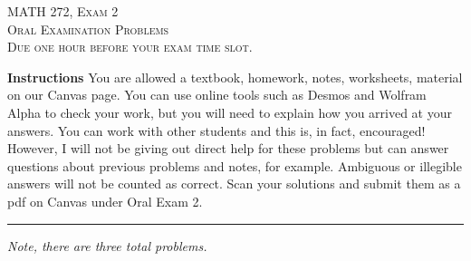 \documentclass[12pt]{amsbook}
\begin{document}

\begin{center}
   \textsc{\large MATH 272, Exam 2}\\
   \textsc{Oral Examination Problems}\\
   \textsc{Due one hour before your exam time slot.}
\end{center}

\vspace{1cm}

\noindent\textbf{Instructions} \; You are allowed a textbook, homework, notes, worksheets, material on our Canvas page.  You can use online tools such as Desmos and Wolfram Alpha to check your work, but you will need to explain how you arrived at your answers.  You can work with other students and this is, in fact, encouraged! However, I will not be giving out direct help for these problems but can answer questions about previous problems and notes, for example. Ambiguous or illegible answers will not be counted as correct. Scan your solutions and submit them as a pdf on Canvas under Oral Exam 2.


\vspace{1cm}


\hrule

\vspace*{1cm}
\noindent\emph{Note, there are three total problems.}

\newpage
\end{document}
